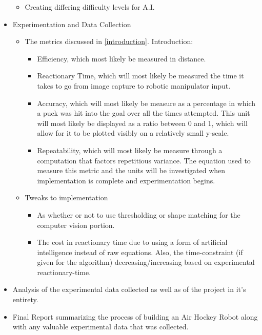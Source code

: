 \documentclass[letterpaper, 10 pt, conference]{ieeeconf}
\begin{document}
\begin{itemize}
\begin{itemize}
\begin{itemize}
\end{itemize}
\item Creating differing difficulty levels for A.I.
\end{itemize}
\item Experimentation and Data Collection
\begin{itemize}
\item The metrics discussed in \ref{introduction}. Introduction:
\begin{itemize}
\item Efficiency, which most likely be measured in distance.
\item Reactionary Time, which will most likely be measured the time it takes to go from image capture to robotic manipulator input.
\item Accuracy, which will most likely be measure as a percentage in which a puck was hit into the goal over all the times attempted.  This unit will most likely be displayed as a ratio between 0 and 1, which will allow for it to be plotted visibly on a relatively small y-scale.
\item Repeatability, which will most likely be measure through a computation that factors repetitious variance.  The equation used to measure this metric and the units will be investigated when implementation is complete and experimentation begins.
\end{itemize}
\item Tweaks to implementation
\begin{itemize}
\item As whether or not to use thresholding or shape matching for the computer vision portion.
\item The cost in reactionary time due to using a form of artificial intelligence instead of raw equations.  Also, the time-constraint (if given for the algorithm) decreasing/increasing based on experimental reactionary-time.
\end{itemize}
\end{itemize}
\item Analysis of the experimental data collected as well as of the project in it's entirety.
\item Final Report summarizing the process of building an Air Hockey Robot along with any valuable experimental data that was collected.
\end{itemize}


\end{document}
